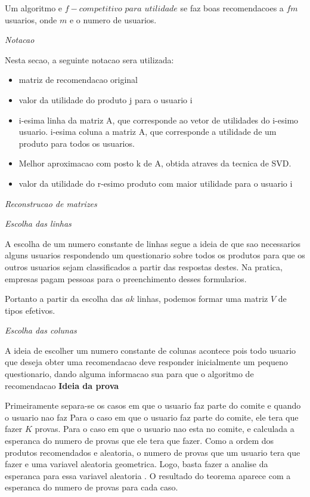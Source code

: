 \documentclass[a4paper,10pt]{article}
\begin{document}
Um algoritmo e $f-competitivo$ $para$ $utilidade$
se faz boas recomendacoes a $fm$ usuarios, onde $m$ e o numero de usuarios. 

\textit{Notacao}

Nesta secao, a seguinte notacao sera utilizada:

\begin{itemize}
\item matriz de recomendacao original
\item valor da utilidade do produto j para o usuario i
\item i-esima linha da matriz A, que corresponde ao
vetor de utilidades do i-esimo usuario.
\ite i-esima coluna a matriz A, que corresponde a 
utilidade de um produto para todos os usuarios.
\item Melhor aproximacao com posto k de A, obtida atraves da tecnica de SVD.
\item valor da utilidade do r-esimo produto com maior utilidade
para o usuario i 
\end{itemize}

\textit{Reconstrucao de matrizes}

\textit{Escolha das linhas}

A escolha de um numero constante de linhas segue a ideia de que sao necessarios
alguns usuarios respondendo um questionario sobre todos os produtos para que os
outros usuarios sejam classificados a partir das respostas destes. Na pratica, empresas
pagam pessoas para o preenchimento desses formularios.

Portanto a partir da escolha das $ak$ linhas, podemos formar uma matriz $V$ de tipos efetivos.

\textit{Escolha das colunas}

A ideia de escolher um numero constante de colunas acontece pois todo usuario
que deseja obter uma recomendacao deve responder inicialmente um pequeno 
questionario, dando alguma informacao sua para que o algoritmo de recomendacao
\textbf{Ideia da prova}

Primeiramente separa-se os casos em que o usuario faz parte do comite e quando
o usuario nao faz 
Para o caso em que o usuario faz parte do comite, ele tera que fazer $K$ provas.
Para o caso em que o usuario nao esta no comite, e calculada a esperanca do numero 
de provas que ele tera que fazer. Como a ordem dos produtos
recomendados e aleatoria, o numero de provas que um usuario tera que fazer
e uma variavel aleatoria geometrica. Logo, basta fazer a analise da esperanca
para essa variavel aleatoria \cite{MG}.
O resultado do teorema aparece com a esperanca do numero de provas para
cada caso.
\end{document}
